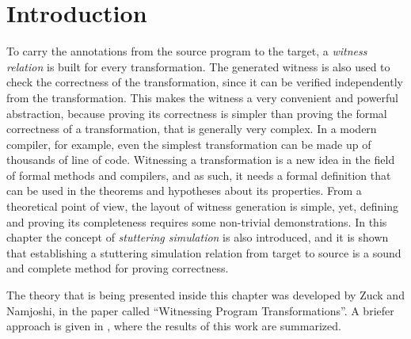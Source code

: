 
\section{Introduction}
\label{sec:theory_introduction}

To carry the annotations from the source program to the target, a \emph{witness relation} is built for every transformation. The generated witness is also used to check the correctness of the transformation, since it can be verified independently from the transformation. This makes the witness a very convenient and powerful abstraction, because proving its correctness is simpler than proving the formal correctness of a transformation, that is generally very complex. In a modern compiler, for example, even the simplest transformation can be made up of thousands of line of code. Witnessing a transformation is a new idea in the field of formal methods and compilers, and as such, it needs a formal definition that can be used in the theorems and hypotheses about its properties. From a theoretical point of view, the layout of witness generation is simple, yet, defining and proving its completeness requires some non-trivial demonstrations. In this chapter the concept of \emph{stuttering simulation} is also introduced, and it is shown that establishing a stuttering simulation relation from target to source is a sound and complete method for proving correctness.

The theory that is being presented inside this chapter was developed by Zuck and Namjoshi, in the paper called ``Witnessing Program Transformations''\cite{zucknamjoshi}. A briefer approach is given in \cite{namjzucktag}, where the results of this work are summarized.

